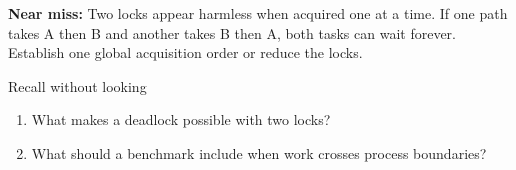 \documentclass[11pt]{article}
\begin{document}
\begin{keepsection}
\begin{notebox}\textbf{Near miss:} Two locks appear harmless when acquired one at a time. If one path takes A then B and another takes B then A, both tasks can wait forever. Establish one global acquisition order or reduce the locks.\end{notebox}

\begin{recallbox}{Recall without looking}
\begin{enumerate}
\item What makes a deadlock possible with two locks?
\item What should a benchmark include when work crosses process boundaries?
\end{enumerate}

\end{recallbox}
\end{keepsection}
\end{document}

